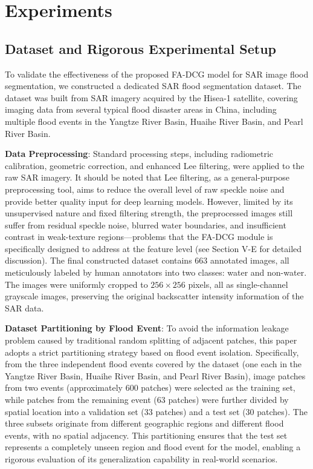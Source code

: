 \documentclass[lettersize,journal]{IEEEtran}
\begin{document}
\section{Experiments}

\subsection{Dataset and Rigorous Experimental Setup}

To validate the effectiveness of the proposed FA-DCG model for SAR image flood segmentation, we constructed a dedicated SAR flood segmentation dataset. The dataset was built from SAR imagery acquired by the Hisea-1 satellite, covering imaging data from several typical flood disaster areas in China, including multiple flood events in the Yangtze River Basin, Huaihe River Basin, and Pearl River Basin.

\textbf{Data Preprocessing}: Standard processing steps, including radiometric calibration, geometric correction, and enhanced Lee filtering, were applied to the raw SAR imagery. It should be noted that Lee filtering, as a general-purpose preprocessing tool, aims to reduce the overall level of raw speckle noise and provide better quality input for deep learning models. However, limited by its unsupervised nature and fixed filtering strength, the preprocessed images still suffer from residual speckle noise, blurred water boundaries, and insufficient contrast in weak-texture regions---problems that the FA-DCG module is specifically designed to address at the feature level (see Section V-E for detailed discussion). The final constructed dataset contains 663 annotated images, all meticulously labeled by human annotators into two classes: water and non-water. The images were uniformly cropped to $256\times256$ pixels, all as single-channel grayscale images, preserving the original backscatter intensity information of the SAR data.

\textbf{Dataset Partitioning by Flood Event}: To avoid the information leakage problem caused by traditional random splitting of adjacent patches, this paper adopts a strict partitioning strategy based on flood event isolation. Specifically, from the three independent flood events covered by the dataset (one each in the Yangtze River Basin, Huaihe River Basin, and Pearl River Basin), image patches from two events (approximately 600 patches) were selected as the training set, while patches from the remaining event (63 patches) were further divided by spatial location into a validation set (33 patches) and a test set (30 patches). The three subsets originate from different geographic regions and different flood events, with no spatial adjacency. This partitioning ensures that the test set represents a completely unseen region and flood event for the model, enabling a rigorous evaluation of its generalization capability in real-world scenarios.
\end{document}
